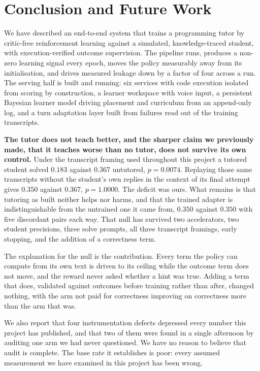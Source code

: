 \section{Conclusion and Future Work}

We have described an end-to-end system that trains a programming tutor by
critic-free reinforcement learning against a simulated, knowledge-traced
student, with execution-verified outcome supervision. The pipeline runs,
produces a non-zero learning signal every epoch, moves the policy measurably
away from its initialisation, and drives measured leakage down by a factor of
four across a run. The serving half is built and running: six services with code
execution isolated from scoring by construction, a learner workspace with voice
input, a persistent Bayesian learner model driving placement and curriculum from
an append-only log, and a turn adaptation layer built from failures read out of
the training transcripts.

\textbf{The tutor does not teach better, and the sharper claim we previously
made, that it teaches worse than no tutor, does not survive its own control.}
Under the transcript framing used throughout this project a tutored student
solved $0.183$ against $0.367$ untutored, $p{=}0.0074$. Replaying those same
transcripts without the student's own replies in the context of its final
attempt gives $0.350$ against $0.367$, $p{=}1.0000$. The deficit was ours. What
remains is that tutoring as built neither helps nor harms, and that the trained
adapter is indistinguishable from the untrained one it came from, $0.350$ against
$0.350$ with five discordant pairs each way. That null has survived two
accelerators, two student precisions, three solve prompts, all three transcript
framings, early stopping, and the addition of a correctness term.

The explanation for the null is the contribution. Every term the policy can
compute from its own text is driven to its ceiling while the outcome term does
not move, and the reward never asked whether a hint was true. Adding a term that
does, validated against outcomes before training rather than after, changed
nothing, with the arm not paid for correctness improving on correctness more
than the arm that was.

We also report that four instrumentation defects depressed every number this
project has published, and that two of them were found in a single afternoon by
auditing one arm we had never questioned. We have no reason to believe that
audit is complete. The base rate it establishes is poor: every assumed
measurement we have examined in this project has been wrong.

